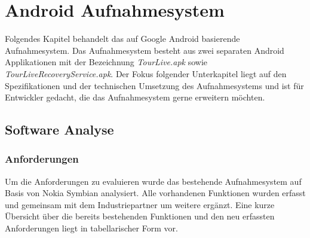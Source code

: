 \chapter{Android Aufnahmesystem}

Folgendes Kapitel behandelt das auf Google Android basierende Aufnahmesystem. Das Aufnahmesystem besteht aus zwei separaten Android Applikationen mit der Bezeichnung \textit{TourLive.apk} sowie \textit{TourLiveRecoveryService.apk}. Der Fokus folgender Unterkapitel liegt auf den Spezifikationen und der technischen Umsetzung des Aufnahmesystems und ist für Entwickler gedacht, die das Aufnahmesystem gerne erweitern möchten.

\section{Software Analyse}

\subsection{Anforderungen}

Um die Anforderungen zu evaluieren wurde das bestehende Aufnahmesystem auf Basis von Nokia Symbian analysiert. Alle vorhandenen Funktionen wurden erfasst und gemeinsam mit dem Industriepartner um weitere ergänzt. 
Eine kurze Übersicht über die bereits bestehenden Funktionen und den neu erfassten Anforderungen liegt in tabellarischer Form vor.

